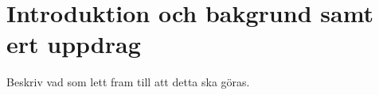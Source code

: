 \section{Introduktion och bakgrund samt ert uppdrag}
Beskriv vad som lett fram till att detta ska göras.